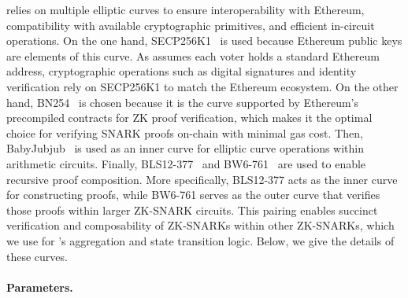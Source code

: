 \Davinci relies on multiple elliptic curves to ensure interoperability with Ethereum, compatibility with available cryptographic primitives, and efficient in-circuit operations. On the one hand, SECP256K1~\cite{brown2010sec} is used because Ethereum public keys are elements of this curve. As \Davinci assumes each voter holds a standard Ethereum address, cryptographic operations such as digital signatures and identity verification rely on SECP256K1 to match the Ethereum ecosystem. On the other hand, BN254~\cite{wood2014ethereum} is chosen because it is the curve supported by Ethereum's precompiled contracts for ZK proof verification, which makes it the optimal choice for verifying SNARK proofs on-chain with minimal gas cost. Then, BabyJubjub~\cite{belles2021twisted} is used as an inner curve for elliptic curve operations within arithmetic circuits. Finally, BLS12-377~\cite{bowe2020zexe} and BW6-761~\cite{elhousni2020optimized} are used to enable recursive proof composition. More specifically, BLS12-377 acts as the inner curve for constructing proofs, while BW6-761 serves as the outer curve that verifies those proofs within larger ZK-SNARK circuits. This pairing enables succinct verification and composability of ZK-SNARKs within other ZK-SNARKs, which we use for \davinci’s aggregation and state transition logic. Below, we give the details of these curves.

\paragraph{Parameters.}

